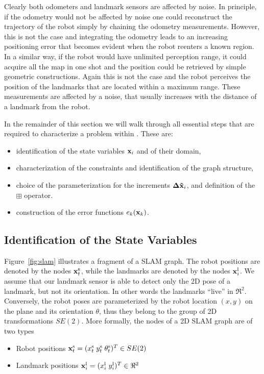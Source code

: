 \documentclass[a4paper]{article}
\begin{document}
Clearly both odometers and landmark sensors are affected by noise.  In
principle, if the odometry would not be affected by noise one could
reconstruct the trajectory of the robot simply by chaining the
odometry measurements. However, this is not the case and integrating
the odometry leads to an increasing positioning error that becomes
evident when the robot reenters a known region. In a similar way,
if the robot would have unlimited perception range, it could acquire
all the map in one shot and the position could be retrieved by simple
geometric constructions. Again this is not the case and the robot
perceives the position of the landmarks that are located within a
maximum range. These measurements are affected by a noise, that
usually increases with the distance of a landmark from the robot.

In the remainder of this section we will walk through all essential
steps that are required to characterize a problem within \gopt{}.
These are:
\begin{itemize}
\item identification of the state variables $\mathbf{x}_i$ and of their domain,
\item characterization of the constraints and identification of the graph structure,
\item choice of the parameterization for the increments $\mathbf{\Delta \tilde x}_i$, and definition of the
$\boxplus$ operator.
\item construction of the error functions $e_k(\mathbf{x}_k)$.
\end{itemize}

\subsection{Identification of the State Variables}
Figure~\ref{fig:slam} illustrates a fragment of a SLAM graph.  The
robot positions are denoted by the nodes $\mathbf{x}^\mathrm{s}_t$, while the
landmarks are denoted by the nodes $\mathbf{x}^\mathrm{l}_i$. We assume that
our landmark sensor is able to detect only the 2D pose of a landmark,
but not its orientation.  In other words the landmarks ``live'' in
$\Re^2$.  Conversely, the robot poses are parameterized by the robot
location $(x,y)$ on the plane and its orientation $\theta$, thus they
belong to the group of 2D transformations $SE(2)$.  More
formally, the nodes of a 2D SLAM graph are of two types
\begin{itemize}
\item Robot positions $\mathbf{x}^\mathrm{s}_t = ( x^\mathrm{s}_t  \; y^\mathrm{s}_t \; \theta^\mathrm{s}_t)^T \in SE(2)$
\item Landmark positions $\mathbf{x}^\mathrm{l}_i = ( x^\mathrm{l}_i  \; y^\mathrm{l}_i )^T \in \Re^2$
\end{itemize}
\end{document}
